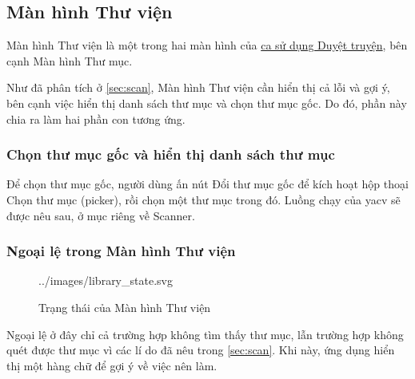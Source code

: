 \documentclass[../../../../thesis]{subfiles}
\begin{document}

\subsection{Màn hình Thư viện}\label{sec:library-design}

Màn hình Thư viện là một trong hai màn hình của \hyperref[sec:browsing]{ca sử
dụng Duyệt truyện}, bên cạnh Màn hình Thư mục.

Như đã phân tích ở \autoref{sec:scan}, Màn hình Thư viện cần hiển thị cả lỗi và
gợi ý, bên cạnh việc hiển thị danh sách thư mục và chọn thư mục gốc. Do đó, phần
này chia ra làm hai phần con tương ứng.

\subsubsection{Chọn thư mục gốc và hiển thị danh sách thư mục}

Để chọn thư mục gốc, người dùng ấn nút Đổi thư mục gốc để kích hoạt hộp thoại
Chọn thư mục (picker), rồi chọn một thư mục trong đó. Luồng chạy của yacv sẽ
được nêu sau, ở mục riêng về Scanner.

%     

\subsubsection{Ngoại lệ trong Màn hình Thư viện}

\begin{wrapfigure}[12]{r}{10cm}
    \centering
    
        {../images/library_state.svg}
    \caption{Trạng thái của Màn hình Thư viện}
    \label{fig:library_state}
\end{wrapfigure}

Ngoại lệ ở đây chỉ cả trường hợp không tìm thấy thư mục, lẫn trường hợp không
quét được thư mục vì các lí do đã nêu trong \autoref{sec:scan}. Khi này, ứng
dụng hiển thị một hàng chữ để gợi ý về việc nên làm.
\end{document}
